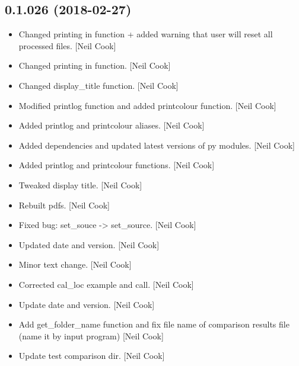 \documentclass[a4paper,10pt,english]{report}
\begin{document}
\subsection{0.1.026 (2018-02-27)}
\label{\detokenize{misc/changelog:id476}}\begin{itemize}
\item {} 
Changed printing in function + added warning that user will reset all
processed files. {[}Neil Cook{]}

\item {} 
Changed printing in function. {[}Neil Cook{]}

\item {} 
Changed display\_title function. {[}Neil Cook{]}

\item {} 
Modified printlog function and added printcolour function. {[}Neil Cook{]}

\item {} 
Added printlog and printcolour aliases. {[}Neil Cook{]}

\item {} 
Added dependencies and updated latest versions of py modules. {[}Neil
Cook{]}

\item {} 
Added printlog and printcolour functions. {[}Neil Cook{]}

\item {} 
Tweaked display title. {[}Neil Cook{]}

\item {} 
Rebuilt pdfs. {[}Neil Cook{]}

\item {} 
Fixed bug: set\_souce -\textgreater{} set\_source. {[}Neil Cook{]}

\item {} 
Updated date and version. {[}Neil Cook{]}

\item {} 
Minor text change. {[}Neil Cook{]}

\item {} 
Corrected cal\_loc example and call. {[}Neil Cook{]}

\item {} 
Update date and version. {[}Neil Cook{]}

\item {} 
Add get\_folder\_name function and fix file name of comparison results
file (name it by input program) {[}Neil Cook{]}

\item {} 
Update test comparison dir. {[}Neil Cook{]}


\end{itemize}
\end{document}
